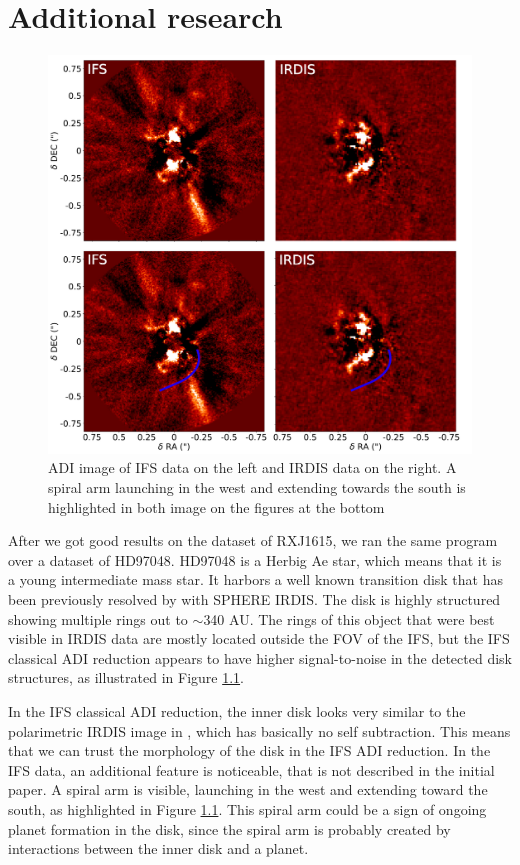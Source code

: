 \documentclass[twoside,single,12pt]{lion-msc}
\begin{document}
\chapter{Additional research}
\begin{figure}
\vspace{-6mm}
\centering
\includegraphics[width=\linewidth]{hdadi}
\caption{ADI image of IFS data on the left and IRDIS data on the right. A spiral arm launching in the west and extending towards the south is highlighted in both image on the figures at the bottom}
\label{fig:hdadi}
\vspace{-8mm}
\end{figure}

After we got good results on the dataset of RXJ1615, we ran the same program over a dataset of HD97048. HD97048 is a Herbig Ae star, which means that it is a young intermediate mass star. It harbors a well known transition disk that has been previously resolved by \citep{Ginski2016} with SPHERE IRDIS. The disk is highly structured showing multiple rings out to $\sim$340 AU. The rings of this object that were best visible in IRDIS data are mostly located outside the FOV of the IFS, but the IFS classical ADI reduction appears to have higher signal-to-noise in the detected disk structures, as illustrated in Figure \ref{fig:hdadi}.
\bigskip

In the IFS classical ADI reduction, the inner disk looks very similar to the polarimetric IRDIS image in \citep{Ginski2016}, which has basically no self subtraction. This means that we can trust the morphology of the disk in the IFS ADI reduction. In the IFS data, an additional feature is noticeable, that is not described in the initial paper. A spiral arm is visible, launching in the west and extending toward the south, as highlighted in Figure \ref{fig:hdadi}. This spiral arm could be a sign of ongoing planet formation in the disk, since the spiral arm is probably created by interactions between the inner disk and a planet.
\bigskip
\end{document}
